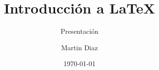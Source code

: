 \documentclass{beamer}
\title{Introducción a LaTeX}
\subtitle{Presentación}
\author{Martin Diaz}
\date{\today}
\begin{document}
	\begin{frame}
		\titlepage
	\end{frame}
\end{document}
